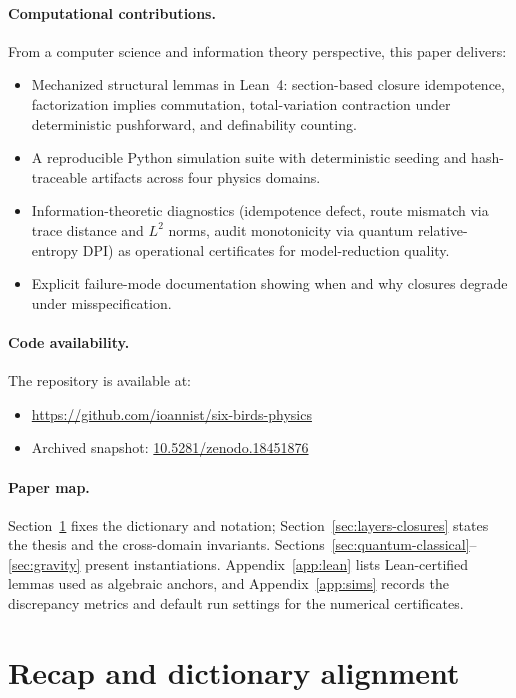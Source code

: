 \documentclass[11pt]{article}
\begin{document}
\paragraph{Computational contributions.}
From a computer science and information theory perspective, this paper delivers:
\begin{itemize}[noitemsep,topsep=2pt]
  \item Mechanized structural lemmas in Lean~4: section-based closure idempotence, factorization implies commutation, total-variation contraction under deterministic pushforward, and definability counting.
  \item A reproducible Python simulation suite with deterministic seeding and hash-traceable artifacts across four physics domains.
  \item Information-theoretic diagnostics (idempotence defect, route mismatch via trace distance and $L^2$ norms, audit monotonicity via quantum relative-entropy DPI) as operational certificates for model-reduction quality.
  \item Explicit failure-mode documentation showing when and why closures degrade under misspecification.
\end{itemize}

\paragraph{Code availability.}
The repository is available at:
\begin{itemize}[noitemsep,topsep=2pt]
\item \url{https://github.com/ioannist/six-birds-physics}
\item Archived snapshot: \href{https://doi.org/10.5281/zenodo.18451876}{10.5281/zenodo.18451876}
\end{itemize}

\paragraph{Paper map.}
Section~\ref{sec:dictionary} fixes the dictionary and notation; Section~\ref{sec:layers-closures} states the thesis and the cross-domain invariants.
Sections~\ref{sec:quantum-classical}--\ref{sec:gravity} present instantiations.
Appendix~\ref{app:lean} lists Lean-certified lemmas used as algebraic anchors, and Appendix~\ref{app:sims} records the discrepancy metrics and default run settings for the numerical certificates.
 \section{Recap and dictionary alignment}
\label{sec:dictionary}
\end{document}
